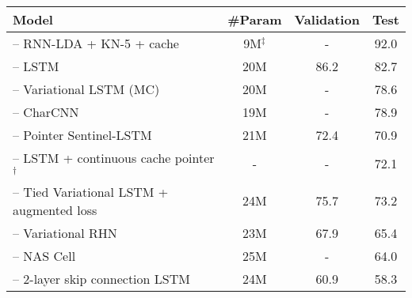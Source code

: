 \begin{table*}[t]%
	\small
	\centering
	\begin{tabular}{l|ccc}
		\toprule
		\bf Model & \bf \#Param & \bf Validation &  \bf Test \\
		\midrule
		\citet{mikolov2012context} -- RNN-LDA + KN-5 + cache & 9M$^\ddagger$ & - & 92.0 \\
		\citet{zaremba2014recurrent} -- LSTM & 20M & 86.2 & 82.7 \\
		\citet{gal2016theoretically} -- Variational LSTM (MC) & 20M & - & 78.6 \\
		\citet{kim2016character} -- CharCNN & 19M & - & 78.9 \\
		\citet{merity2016pointer} -- Pointer Sentinel-LSTM & 21M & 72.4 & 70.9 \\
		\citet{grave2016improving} -- LSTM + continuous cache pointer$^\dagger$ & - & - & 72.1 \\
		\citet{inan2016tying} -- Tied Variational LSTM + augmented loss & 24M & 75.7 & 73.2 \\
		\citet{zilly2016recurrent} -- Variational RHN & 23M & 67.9 & 65.4 \\
		\citet{zoph2016neural} -- NAS Cell & 25M & - & 64.0 \\
		\citet{melis2017state} -- 2-layer skip connection LSTM & 24M & 60.9 & 58.3 \\

\end{tabular}
\end{table*}
